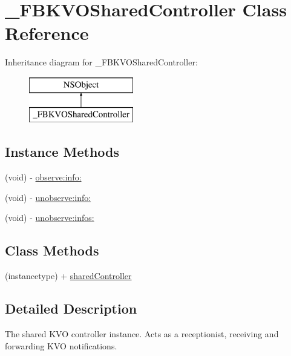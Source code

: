 \hypertarget{interface___f_b_k_v_o_shared_controller}{\section{\+\_\+\+F\+B\+K\+V\+O\+Shared\+Controller Class Reference}
\label{interface___f_b_k_v_o_shared_controller}
}
Inheritance diagram for \+\_\+\+F\+B\+K\+V\+O\+Shared\+Controller\+:\begin{figure}[H]
\begin{center}
\leavevmode
\includegraphics[height=2.000000cm]{interface___f_b_k_v_o_shared_controller}
\end{center}
\end{figure}
\subsection*{Instance Methods}
\begin{DoxyCompactItemize}
\item 
(void) -\/ \hyperlink{interface___f_b_k_v_o_shared_controller_a3366ca557180fa6dad444c775649bff6}{observe\+:info\+:}
\item 
(void) -\/ \hyperlink{interface___f_b_k_v_o_shared_controller_a86296472b759a5957e40bfe799e8073e}{unobserve\+:info\+:}
\item 
(void) -\/ \hyperlink{interface___f_b_k_v_o_shared_controller_ac4ddda4d74732273dfe84a8edbbccfd0}{unobserve\+:infos\+:}
\end{DoxyCompactItemize}
\subsection*{Class Methods}
\begin{DoxyCompactItemize}
\item 
(instancetype) + \hyperlink{interface___f_b_k_v_o_shared_controller_afc8dc49222e1a694297251398e1a5341}{shared\+Controller}
\end{DoxyCompactItemize}


\subsection{Detailed Description}
The shared K\+V\+O controller instance.  Acts as a receptionist, receiving and forwarding K\+V\+O notifications. 

